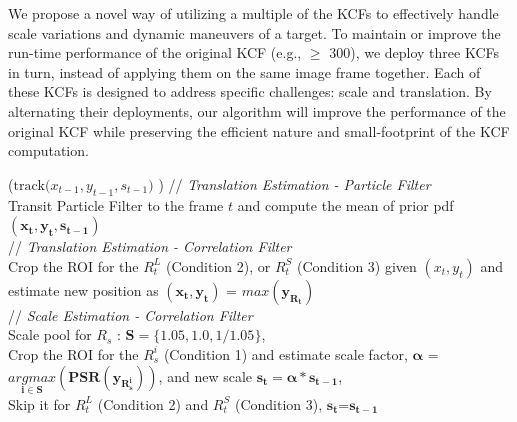\documentclass[10pt,twocolumn,letterpaper]{article}
\begin{document}
We propose a novel way of utilizing a multiple of the KCFs
\cite{henriques2015high} to effectively handle scale variations and
dynamic maneuvers of a target. To maintain or improve the run-time
performance of the original KCF (e.g., $\ge$ 300), we deploy three
KCFs in turn, instead of applying them on the same image frame
together. Each of these KCFs is designed to address specific
challenges: scale and translation. By alternating their deployments,
our algorithm will improve the performance of the original KCF while
preserving the efficient nature and small-footprint of the KCF
computation.

\begin{algorithm*}[h]
\small
\DontPrintSemicolon
{}
\Begin($\text{track($x_{t-1},y_{t-1},s_{t-1}$) }$)
{
 	// \textit{Translation Estimation - Particle Filter} \\
	Transit Particle Filter to the frame $t$ and compute the mean of prior pdf $\mathbf{(x_{t},y_{t},s_{t-1})}$ \\
     // \textit{Translation Estimation - Correlation Filter} \\
	Crop the ROI for the $R_{t}^{L}$ (Condition 2), or $R_{t}^{S}$ (Condition 3) given $(x_{t},y_{t})$ and estimate new position as $\mathbf{(x_{t},y_{t})}$ = $\mathbf{\textit{max}(y_{R_{t}})}$\\
	// \textit{Scale Estimation - Correlation Filter}\\
	Scale pool for $R_{s}$ : $\mathbf{S} = \lbrace1.05,1.0,1/1.05\rbrace$,\\
	Crop the ROI for the $R_{s}^{i}$ (Condition 1) and estimate scale factor, $\mathbf{\alpha}$ = $\mathbf{\underset{i\in S}{\textit{argmax}}(PSR(y_{R_{s}^{i}}))}$, and new scale $\mathbf{s_{t} = \alpha * s_{t-1}}$,\\ 
	Skip it for $R_{t}^{L}$ (Condition 2) and $R_{t}^{S}$ (Condition 3), $\mathbf{s_{t}}$=$\mathbf{s_{t-1}}$\\
}
\end{algorithm*}
\end{document}
